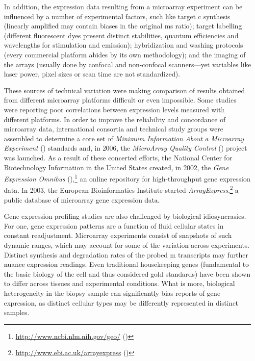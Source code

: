 \medskip

In addition, the expression data resulting from a microarray experiment can be
influenced by a number of experimental factors, such like target
c synthesis (linearly amplified  may contain
biases in the original ms ratio);\cite{nygaard_options_2006}
target labelling (different fluorescent dyes present distinct stabilities,
quantum efficiencies and wavelengths for stimulation and emission);
hybridization and washing protocols (every commercial platform abides by its own
methodology); and the imaging of the arrays (usually done by confocal and
non-confocal scanners---yet variables like laser power, pixel sizes or scan time
are not standardized).

These sources of technical variation were making comparison of results obtained
from different microarray platforms difficult or even impossible.  Some studies
were reporting poor correlations between expression levels measured with
different platforms.\cite{tan_evaluation_2003,shi_cross-platform_2005} In order
to improve the reliability and concordance of microarray data, international
consortia and technical study groups were assembled to determine a core set of
\emph{Minimum Information About a Microarray Experiment} ()
standards\cite{brazma_minimum_2001} and, in 2006, the \emph{MicroArray Quality
  Control} () project was
launched.\cite{maqc_consortium_microarray_2006} As a result of these concerted
efforts, the National Center for Biotechnology Information in the United States
created, in 2002, the \emph{Gene Expression Omnibus}
(),\footnote{\url{http://www.ncbi.nlm.nih.gov/geo/}
  (\citealp{edgar_gene_2002})} an online repository for \mbox{high-throughput}
gene expression data.  In 2003, the European Bioinformatics Institute started
\emph{ArrayExpress},\footnote{\url{http://www.ebi.ac.uk/arrayexpress}
  (\citealp{brazma_arrayexpress--public_2003})} a public database of microarray
gene expression data.

Gene expression profiling studies are also challenged by biological
idiosyncrasies.  For one, gene expression patterns are a function of fluid
cellular states in constant readjustment.  Microarray experiments consist of
snapshots of such dynamic ranges, which may account for some of the variation
across experiments.  Distinct synthesis and degradation rates of the probed
m transcripts may further nuance expression readings.  Even
traditional housekeeping genes (fundamental to the basic biology of the cell and
thus considered gold standards) have been shown to differ across tissues and
experimental conditions.\cite{thorrez_using_2008} What is more, biological
heterogeneity in the biopsy sample can significantly bias reports of gene
expression, as distinct cellular types may be differently represented in
distinct samples.

